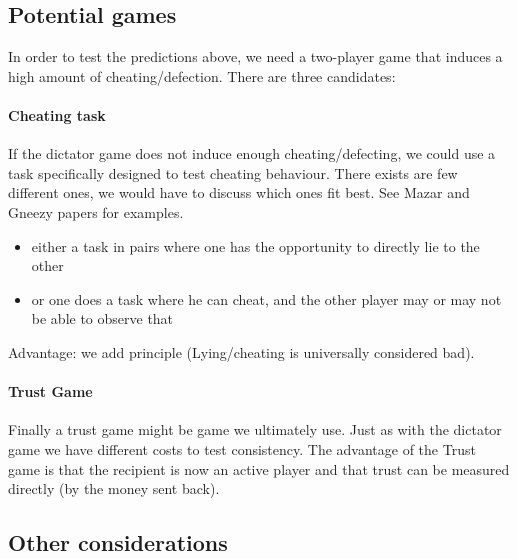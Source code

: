 \documentclass[11pt]{article}
\theoremstyle{plainCl1}
\begin{document}
\subsection{Potential games}
In order to test the predictions above, we need a two-player game that induces a high amount of cheating/defection. There are three candidates:

\paragraph{Cheating task}

If the dictator game does not induce enough cheating/defecting, we could use a task specifically designed to test cheating behaviour. 
There exists are few different ones, we would have to discuss which ones fit best. See Mazar and Gneezy papers for examples.
\begin{itemize}
    \item either a task in pairs where one has the opportunity to directly lie to the other
    \item or one does a task where he can cheat, and the other player may or may not be able to observe that
\end{itemize}
Advantage: we add principle (Lying/cheating is universally considered bad). 

\paragraph{Trust Game}

Finally a trust game might be game we ultimately use. Just as with the dictator game we have different costs to test consistency. 
The advantage of the Trust game is that the recipient is now an active player and that trust can be measured directly (by the money sent back). 

\subsection{Other considerations}
\end{document}
